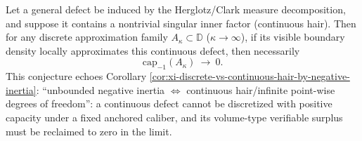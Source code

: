 \begin{conjecture}\label{conj:xi-continuous-hair-capacity-collapse}
Let a general defect be induced by the Herglotz/Clark measure decomposition, and suppose it contains a nontrivial singular inner factor (continuous hair).
Then for any discrete approximation family \(A_\kappa\subset\mathbb D\) (\(\kappa\to\infty\)), if its visible boundary density locally approximates this continuous defect, then necessarily
\[
\mathrm{cap}_{-1}(A_\kappa)\ \longrightarrow\ 0.
\]
This conjecture echoes Corollary \ref{cor:xi-discrete-vs-continuous-hair-by-negative-inertia}: ``unbounded negative inertia \(\Leftrightarrow\) continuous hair/infinite point-wise degrees of freedom'': a continuous defect cannot be discretized with positive capacity under a fixed anchored caliber, and its volume-type verifiable surplus must be reclaimed to zero in the limit.
\end{conjecture}

\endinput


